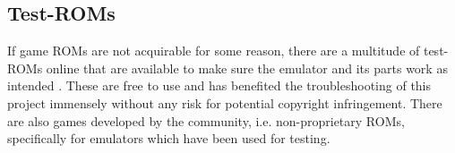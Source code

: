 
\subsection{Test-ROMs}

If game ROMs are not acquirable for some reason, there are a multitude of test-ROMs online that are available to make sure the emulator and its parts work as intended \cite{testROMs}. These are free to use and has benefited the troubleshooting of this project immensely without any risk for potential copyright infringement. There are also games developed by the community, i.e. non-proprietary ROMs, specifically for emulators which have been used for testing.


